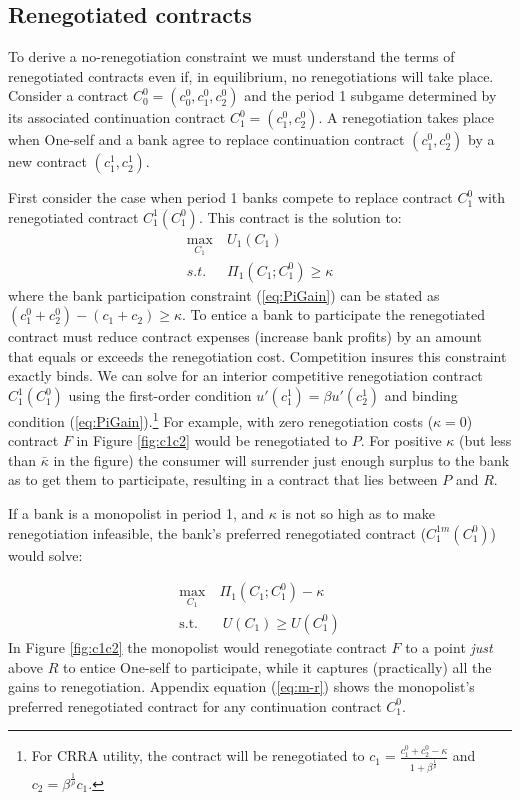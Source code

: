 \documentclass[11pt,english]{article}
\theoremstyle{plain}
\theoremstyle{definition}
\begin{document}
\subsection{Renegotiated contracts}

To derive a no-renegotiation constraint we must understand the
terms of renegotiated contracts even if, in equilibrium, no renegotiations
will take place. Consider a contract $C_{0}^{0}=(c_{0}^{0},c_{1}^{0},c_{2}^{0})$
and the period 1 subgame determined by its associated continuation
contract $C_{1}^{0}=(c_{1}^{0},c_{2}^{0})$. A renegotiation takes
place when One-self and a bank agree to replace continuation contract
$(c_{1}^{0},c_{2}^{0})$ by a new contract $\left(c_{1}^{1},c_{2}^{1}\right)$.


First consider the case when period 1 banks compete to replace contract
$C_{1}^{0}$ with renegotiated contract $C_{1}^{1}(C_{1}^{0})$. This contract is the solution to: 
\begin{align}
\max_{C_{1}} & \ U_{1}(C_{1})\\
s.t. & \ \Pi_{1}(C_{1};C_{1}^{0})\ge\kappa\label{eq:PiGain}
\end{align}
{}where the bank participation constraint (\ref{eq:PiGain}) can be stated
as $(c_{1}^{0}+c_{2}^{0})-(c_{1}+c_{2})\ge\kappa$. To entice a bank
to participate the renegotiated contract must reduce contract expenses (increase bank profits) by an amount that equals or exceeds the
renegotiation cost. Competition insures this constraint exactly
binds. We can solve for an
interior competitive renegotiation contract $C_{1}^{1}(C_{1}^{0})$ using the first-order condition $u'(c_{1}^{1})=\beta u'(c_{2}^{1})$
and binding condition (\ref{eq:PiGain}).\footnote{ For CRRA utility, the contract will be renegotiated to $c_{1}=\frac{c_{1}^{0}+c_{2}^{0}-\kappa}{1+\beta^{\frac{1}{\rho}}}$
and $c_{2}=\beta^{\frac{1}{\rho}}c_{1}$. } For example, with zero renegotiation costs ($\kappa=0$) contract
$F$ in Figure \ref{fig:c1c2} would be renegotiated to $P$. For
positive $\kappa$ (but less than $\bar{\kappa}$ in the figure) the
consumer will surrender just enough surplus to the bank as to get
them to participate, resulting in a contract that lies between $P$
and $R$.

If a bank is a monopolist in period 1, and $\kappa$ is not so high
as to make renegotiation infeasible, the bank's preferred renegotiated contract ($C_{1}^{1m}(C_{1}^{0})$) would solve:

\begin{align}
\max_{C_{1}}\ & \Pi_{1}(C_{1};C_{1}^{0})-\kappa\\
\text{s.t.} & \ U(C_{1})\geq U(C_{1}^{0})\label{eq:ugain}
\end{align}
In Figure \ref{fig:c1c2} the monopolist would renegotiate contract
$F$ to a point \textit{just} above $R$ to entice One-self
to participate, while it captures (practically) all the gains to renegotiation. Appendix equation (\ref{eq:m-r}) shows the monopolist's
preferred renegotiated contract for any continuation contract
$C_{1}^{0}$.
\end{document}
